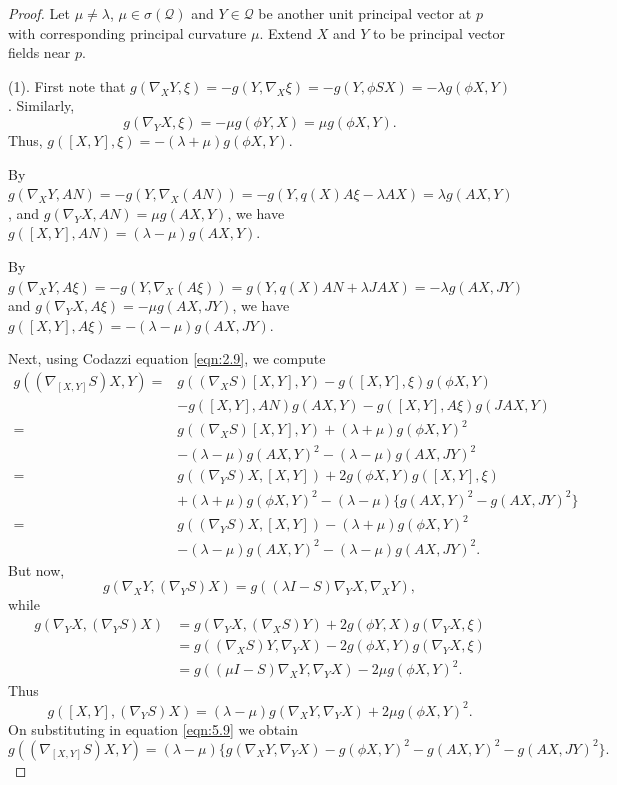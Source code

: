 \documentclass[reqno]{amsart}%
\theoremstyle{definition}
\numberwithin{equation}{section}
\begin{document}
\begin{proof}
Let $\mu\neq\lambda$, $\mu\in\sigma(\mathcal{Q})$ and $Y\in \mathcal{Q}$ be another unit
principal vector at $p$ with corresponding principal
curvature $\mu$. Extend $X$ and $Y$ to be principal vector fields near $p$.

(1). First note that $g(\nabla_X Y,\xi)=-g(Y,\nabla_X \xi)=-g(Y,\phi SX)=-\lambda g(\phi X,Y)$. Similarly,
$$
g(\nabla_Y X,\xi)=-\mu g(\phi Y,X)=\mu g(\phi X,Y).
$$
Thus, $g([X,Y],\xi)=-(\lambda+\mu)g(\phi X,Y)$.

By $g(\nabla_X Y,AN)=-g(Y,\nabla_X (AN))=-g(Y,q(X)A\xi-\lambda AX)=\lambda g(A X,Y)$, and
$g(\nabla_Y X,AN)=\mu g(AX,Y)$, we have $g([X,Y],AN)=(\lambda-\mu)g(AX,Y)$.

By $g(\nabla_X Y,A\xi)=-g(Y,\nabla_X (A\xi))=g(Y,q(X)AN+\lambda JAX)=-\lambda g(AX,JY)$ and
$g(\nabla_Y X,A\xi)=-\mu g(AX,JY)$, we have $g([X,Y],A\xi)=-(\lambda-\mu)g(AX,JY)$.

Next, using Codazzi equation \eqref{eqn:2.9}, we compute
\begin{equation}\label{eqn:5.9}
\begin{aligned}
g((\nabla_{[X,Y]}S)X,Y)=&g((\nabla_X S)[X,Y],Y)-g([X,Y],\xi)g(\phi X,Y)\\
&-g([X,Y],AN)g(AX,Y)-g([X,Y],A\xi)g(JAX,Y)\\
=&g((\nabla_X S)[X,Y],Y)+(\lambda+\mu)g(\phi X,Y)^2\\
&-(\lambda-\mu)g(AX,Y)^2-(\lambda-\mu)g(AX,JY)^2\\
=&g((\nabla_Y S)X,[X,Y])+2g(\phi X,Y)g([X,Y],\xi)\\
&+(\lambda+\mu)g(\phi X,Y)^2-(\lambda-\mu)\{g(AX,Y)^2-g(AX,JY)^2\}\\
=&g((\nabla_Y S)X,[X,Y])-(\lambda+\mu)g(\phi X,Y)^2\\
&-(\lambda-\mu)g(AX,Y)^2-(\lambda-\mu)g(AX,JY)^2.
\end{aligned}
\end{equation}
But now,
$$
g(\nabla_X Y,(\nabla_Y S)X)=g((\lambda I-S)\nabla_Y X,\nabla_X Y),
$$
while
$$
\begin{aligned}
g(\nabla_Y X,(\nabla_Y S)X)&=g(\nabla_Y X,(\nabla_X S)Y)+2g(\phi Y,X)g(\nabla_Y X,\xi)\\
&=g((\nabla_X S)Y,\nabla_Y X)-2g(\phi X,Y)g(\nabla_Y X,\xi)\\
&=g((\mu I-S)\nabla_X Y,\nabla_Y X)-2\mu g(\phi X,Y)^2.
\end{aligned}
$$
Thus
\begin{equation}\label{eqn:5.10}
g([X,Y],(\nabla_Y S)X)=(\lambda-\mu)g(\nabla_X Y,\nabla_Y X)+2\mu g(\phi X,Y)^2.
\end{equation}
On substituting in equation \eqref{eqn:5.9} we obtain
%
\begin{equation}\label{eqn:5.1}
g((\nabla_{[X,Y]} S)X,Y)=(\lambda-\mu)\Big\{g(\nabla_X Y,\nabla_Y X)
-g(\phi X,Y)^2-g(AX,Y)^2-g(AX,JY)^2\Big\}.
\end{equation}


\end{proof}
\end{document}
